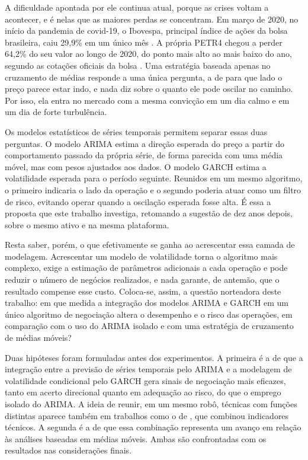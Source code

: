 A dificuldade apontada por ele continua atual, porque as crises voltam a
acontecer, e é nelas que as maiores perdas se concentram. Em março de 2020, no
início da pandemia de covid-19, o Ibovespa, principal índice de ações da bolsa
brasileira, caiu 29,9\% em um único mês \cite{maximo2020}. A própria PETR4
chegou a perder 64,2\% do seu valor ao longo de 2020, do ponto mais alto ao mais
baixo do ano, segundo as cotações oficiais da bolsa \cite{b3Cotahist}.
 Uma estratégia baseada
apenas no cruzamento de médias responde a uma única pergunta, a de para que lado
o preço parece estar indo, e nada diz sobre o quanto ele pode oscilar no caminho.
Por isso, ela entra no mercado com a mesma convicção em um dia calmo e em um dia
de forte turbulência.

Os modelos estatísticos de séries temporais permitem separar essas duas
perguntas. O modelo ARIMA estima a direção esperada do preço a partir do
comportamento passado da própria série, de forma parecida com uma média móvel,
mas com pesos ajustados aos dados. O modelo GARCH estima a volatilidade esperada
para o período seguinte. Reunidos em um mesmo algoritmo, o primeiro indicaria o
lado da operação e o segundo poderia atuar como um filtro de risco, evitando
operar quando a oscilação esperada fosse alta. É essa a proposta que este
trabalho investiga, retomando a sugestão de  dez anos
depois, sobre o mesmo ativo e na mesma plataforma.

Resta saber, porém, o que efetivamente se ganha ao acrescentar essa camada de
modelagem. Acrescentar um modelo de volatilidade torna o algoritmo mais complexo,
exige a estimação de parâmetros adicionais a cada operação e pode reduzir o
número de negócios realizados, e nada garante, de antemão, que o resultado compense esse
custo. Coloca-se, assim, a questão norteadora deste trabalho: em que medida a
integração dos modelos ARIMA e GARCH em um único algoritmo de negociação altera o
desempenho e o risco das operações, em comparação com o uso do ARIMA isolado e com
uma estratégia de cruzamento de médias móveis?

Duas hipóteses foram formuladas antes dos experimentos. A primeira é a de que a
integração entre a previsão de séries temporais pelo ARIMA e a modelagem de
volatilidade condicional pelo GARCH gera sinais de negociação mais eficazes, tanto
em acerto direcional quanto em adequação ao risco, do que o emprego isolado do
ARIMA. A ideia de reunir, em um mesmo robô, técnicas com funções distintas aparece
também em trabalhos como o de , que combinou indicadores
técnicos. A segunda é a de que
essa combinação representa um avanço em relação às análises baseadas em médias
móveis. Ambas são confrontadas com os resultados nas considerações finais.

